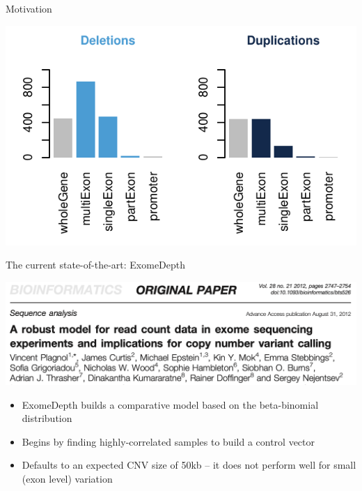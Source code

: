\documentclass[
  10pt,
  ignorenonframetext,
  m]{beamer}
\begin{document}
\begin{frame}{Motivation}
\protect\hypertarget{motivation-1}{}

\centering

\begin{center}\includegraphics{defense_files/figure-beamer/truty-1} \end{center}

\end{frame}

\begin{frame}{The current state-of-the-art: ExomeDepth}
\protect\hypertarget{the-current-state-of-the-art-exomedepth}{}

\centering

\includegraphics{images/exomeDepth.png} \raggedright

\begin{itemize}
\item
  ExomeDepth builds a comparative model based on the beta-binomial
  distribution
\item
  Begins by finding highly-correlated samples to build a control vector
\item
  Defaults to an expected CNV size of 50kb -- it does not perform well
  for small (exon level) variation
\end{itemize}

\end{frame}
\end{document}
